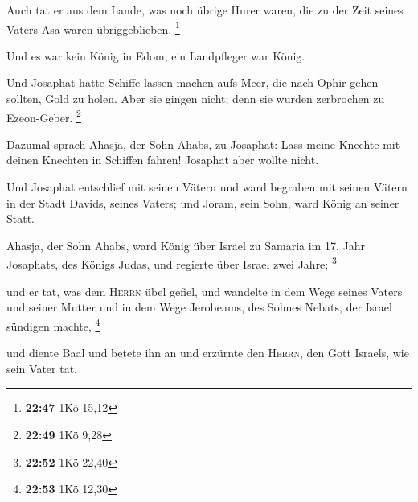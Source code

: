  Auch tat er aus dem Lande, was noch übrige Hurer waren,
die zu der Zeit seines Vaters Asa waren übriggeblieben. \footnote{\textbf{22:47}
  1Kö 15,12}

 Und es war kein König in Edom; ein Landpfleger war
König.

 Und Josaphat hatte Schiffe lassen machen aufs Meer, die
nach Ophir gehen sollten, Gold zu holen. Aber sie gingen nicht; denn sie
wurden zerbrochen zu Ezeon-Geber. \footnote{\textbf{22:49} 1Kö 9,28}

 Dazumal sprach Ahasja, der Sohn Ahabs, zu Josaphat: Lass
meine Knechte mit deinen Knechten in Schiffen fahren! Josaphat aber
wollte nicht.

 Und Josaphat entschlief mit seinen Vätern und ward
begraben mit seinen Vätern in der Stadt Davids, seines Vaters; und
Joram, sein Sohn, ward König an seiner Statt.

 Ahasja, der Sohn Ahabs, ward König über Israel zu
Samaria im 17. Jahr Josaphats, des Königs Judas, und regierte über
Israel zwei Jahre; \footnote{\textbf{22:52} 1Kö 22,40}

 und er tat, was dem \textsc{Herrn} übel gefiel, und
wandelte in dem Wege seines Vaters und seiner Mutter und in dem Wege
Jerobeams, des Sohnes Nebats, der Israel sündigen machte, \footnote{\textbf{22:53}
  1Kö 12,30}

 und diente Baal und betete ihn an und erzürnte den
\textsc{Herrn}, den Gott Israels, wie sein Vater tat.
